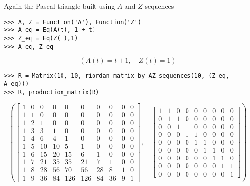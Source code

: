 \begin{example}
Again the Pascal triangle built using $A$ and $Z$ sequences
\begin{verbatim}
>>> A, Z = Function('A'), Function('Z')
>>> A_eq = Eq(A(t), 1 + t)
>>> Z_eq = Eq(Z(t),1)
>>> A_eq, Z_eq
\end{verbatim}
\begin{displaymath}
\left ( A{\left (t \right )} = t + 1, \quad Z{\left (t \right )} = 1\right )
\end{displaymath}
\begin{verbatim}
>>> R = Matrix(10, 10, riordan_matrix_by_AZ_sequences(10, (Z_eq, A_eq)))
>>> R, production_matrix(R)
\end{verbatim}
\begin{displaymath}
\left ( \left[\begin{matrix}1 & 0 & 0 & 0 & 0 & 0 & 0 & 0 & 0 & 0\\1 & 1 & 0 & 0 & 0 & 0 & 0 & 0 & 0 & 0\\1 & 2 & 1 & 0 & 0 & 0 & 0 & 0 & 0 & 0\\1 & 3 & 3 & 1 & 0 & 0 & 0 & 0 & 0 & 0\\1 & 4 & 6 & 4 & 1 & 0 & 0 & 0 & 0 & 0\\1 & 5 & 10 & 10 & 5 & 1 & 0 & 0 & 0 & 0\\1 & 6 & 15 & 20 & 15 & 6 & 1 & 0 & 0 & 0\\1 & 7 & 21 & 35 & 35 & 21 & 7 & 1 & 0 & 0\\1 & 8 & 28 & 56 & 70 & 56 & 28 & 8 & 1 & 0\\1 & 9 & 36 & 84 & 126 & 126 & 84 & 36 & 9 & 1\end{matrix}\right], \quad \left[\begin{matrix}1 & 1 & 0 & 0 & 0 & 0 & 0 & 0 & 0\\0 & 1 & 1 & 0 & 0 & 0 & 0 & 0 & 0\\0 & 0 & 1 & 1 & 0 & 0 & 0 & 0 & 0\\0 & 0 & 0 & 1 & 1 & 0 & 0 & 0 & 0\\0 & 0 & 0 & 0 & 1 & 1 & 0 & 0 & 0\\0 & 0 & 0 & 0 & 0 & 1 & 1 & 0 & 0\\0 & 0 & 0 & 0 & 0 & 0 & 1 & 1 & 0\\0 & 0 & 0 & 0 & 0 & 0 & 0 & 1 & 1\\0 & 0 & 0 & 0 & 0 & 0 & 0 & 0 & 1\end{matrix}\right]\right )
\end{displaymath}
\end{example}


